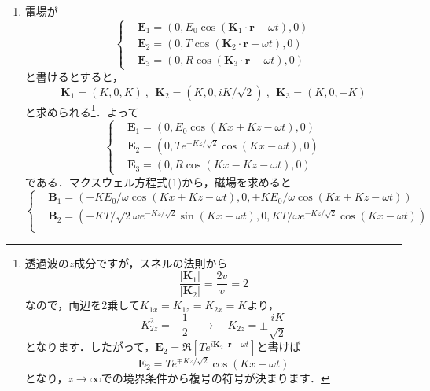 \documentclass[a4paper,pdflatex,ja=standard]{bxjsarticle}
\begin{document}
\begin{enumerate}
  \item 
  電場が
  \begin{equation}
    \left\{\begin{alignedat}{1}
      &
      \bm{E}_{1}
      =(0,E_{0}\cos(\bm{K}_{1}\cdot\bm{r}-\omega t),0)
      \\
      &
      \bm{E}_{2}
      =(0,T\cos(\bm{K}_{2}\cdot\bm{r}-\omega t),0)
      \\
      &
      \bm{E}_{3}
      =(0,R\cos(\bm{K}_{3}\cdot\bm{r}-\omega t),0)
    \end{alignedat}\right.
  \end{equation}
  と書けるとすると，
  \begin{equation}
    \bm{K}_{1}
    =(K,0,K)
    \ ,\ \ 
    \bm{K}_{2}
    =
    (K,0,iK/\sqrt{2})
    \ ,\ \ 
    \bm{K}_{3}
    =
    (K,0,-K)
  \end{equation}
  と求められる\footnote{
    透過波の$z$成分ですが，スネルの法則から
    $$
      \frac{|\bm{K}_1|}{|\bm{K}_2|}
      =
      \frac{2v}{v}
      =
      2
    $$
    なので，両辺を2乗して$K_{1x}=K_{1z}=K_{2x}=K$より，
    $$
      K_{2z}^2
      =
      -\frac{1}{2}
      \quad\rightarrow\quad
      K_{2z}
      =
      \pm\frac{iK}{\sqrt{2}}
    $$
    となります．したがって，$\bm{E}_2=\Re\left[ Te^{i\bm{K}_2\cdot\bm{r}-\omega t} \right]$と書けば
    $$
      \bm{E}_2=Te^{\mp Kz/\sqrt{2}}\cos(Kx-\omega t)
    $$
    となり，$z\rightarrow\infty$での境界条件から複号の符号が決まります．
  }．よって
  \begin{equation}
    \left\{\begin{alignedat}{1}
      &
      \bm{E}_{1}
      =(0,E_{0}\cos(Kx+Kz-\omega t),0)
      \\
      &
      \bm{E}_{2}
      =(0,Te^{-Kz/\sqrt{2}}\cos(Kx-\omega t),0)
      \\
      &
      \bm{E}_{3}
      =(0,R\cos(Kx-Kz-\omega t),0)
    \end{alignedat}\right.
  \end{equation}
  である．マクスウェル方程式(1)から，磁場を求めると
  \begin{equation}
    \left\{\begin{alignedat}{1}
      &
      \bm{B}_{1}
      =
      (-KE_{0}/\omega\cos(Kx+Kz-\omega t),0,+KE_{0}/\omega\cos(Kx+Kz-\omega t))
      \\
      &
      \bm{B}_{2}
      =
      (+KT/\sqrt{2}\omega e^{-Kz/\sqrt{2}}\sin(Kx-\omega t),0,KT/\omega e^{-Kz/\sqrt{2}}\cos(Kx-\omega t))
      \\
      &

\end{alignedat}
\end{equation}
\end{enumerate}
\end{document}
